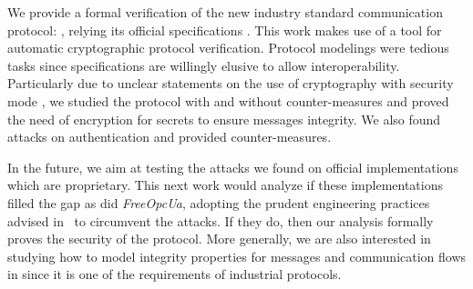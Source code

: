 We provide a formal verification of the new industry standard
communication protocol: \opcua, relying its official specifications
\cite{MLD09,opcua_part2,opcua_part4,opcua_part6}.
This work makes use of \proverif{} a tool for automatic cryptographic protocol
verification. 
Protocol modelings were tedious tasks since specifications are willingly elusive
to allow interoperability.
Particularly due to unclear statements on the use of cryptography with security
mode \sms, we studied the protocol with and without counter-measures and proved
the need of encryption for secrets to ensure messages integrity.
We also found attacks on authentication and provided counter-measures.

In the future, we aim at testing the attacks we found on official
implementations which are proprietary. This next work would analyze
if these implementations filled the gap as did {\em FreeOpcUa}, 
adopting the prudent engineering practices advised in~\cite{AN96} to
circumvent the attacks.
If they do, then our analysis formally proves the security of the protocol.
More generally, we are also interested in
studying how to model integrity properties for messages and
communication flows in \proverif{} since it is one of the requirements
of industrial protocols.
